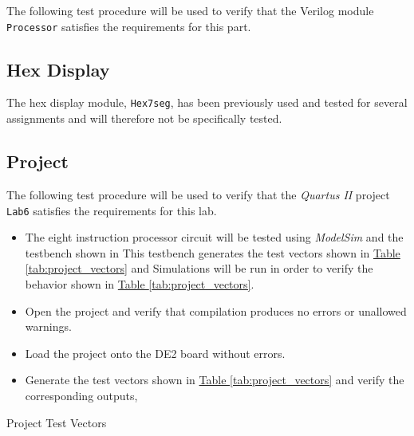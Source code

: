 The following test procedure will be used to verify that the Verilog module \verb|Processor| satisfies the requirements for this part.



\subsection{Hex Display} %
\label{sub:hex_display}

The hex display module, \verb|Hex7seg|, has been previously used and tested for several assignments and will therefore not be specifically tested.

\subsection{Project} %
\label{sub:project}

The following test procedure will be used to verify that the \emph{Quartus II} project \verb|Lab6| satisfies the requirements for this lab.

\begin{itemize}
    \item The eight instruction processor circuit will be tested using \emph{ModelSim} and the testbench shown in %
    This testbench generates the test vectors shown in \hyperref[tab:project_vectors]{Table \ref*{tab:project_vectors}} and %
    Simulations will be run in order to verify the behavior shown in \hyperref[tab:project_vectors]{Table \ref*{tab:project_vectors}}.
    \item Open the project and verify that compilation produces no errors or unallowed warnings.
    \item Load the project onto the DE2 board without errors.
    \item Generate the test vectors shown in \hyperref[tab:project_vectors]{Table \ref*{tab:project_vectors}} and verify the corresponding outputs,%
\end{itemize}

\begin{table}[htbp]
    \centering
    \caption{Project Test Vectors\label{tab:project_vectors}}
\end{table}


